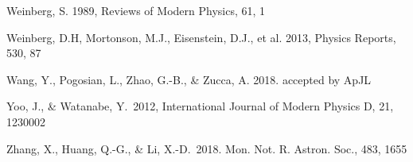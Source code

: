 \documentclass[twocolumn]{aastex61}
\begin{document}
\begin{thebibliography}{}








Weinberg, S. 1989, Reviews of Modern Physics, 61, 1

Weinberg, D.H, Mortonson, M.J., Eisenstein, D.J., et al. 2013, Physics Reports, 530, 87

Wang, Y., Pogosian, L., Zhao, G.-B., \& Zucca, A. 2018. accepted by ApJL

%
Yoo, J., \& Watanabe, Y.\ 2012, International Journal of Modern Physics D, 21, 1230002 



Zhang, X., Huang, Q.-G., \& Li, X.-D.\ 2018. Mon. Not. R. Astron. Soc., 483, 1655



\end{thebibliography}
\end{document}

